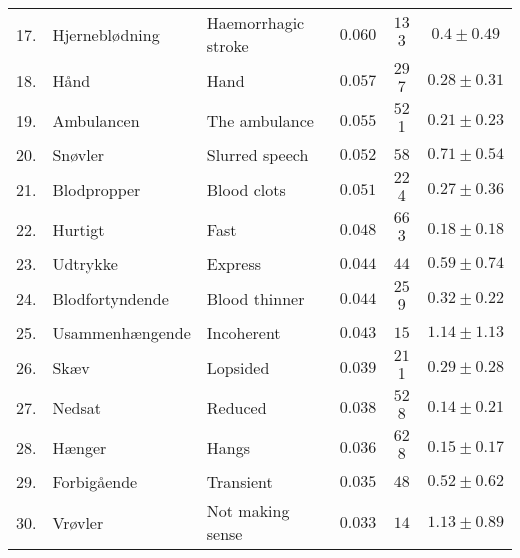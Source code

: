{\begin{table}[h]
{\begin{tabular}{l|llccc}
        17. & Hjerneblødning & Haemorrhagic stroke & $0.060$ & $13$3 & $0.4 \pm 0.49$ \\
        18. & Hånd & Hand & $0.057$ & $29$7 & $0.28 \pm 0.31$ \\
        19. & Ambulancen & The ambulance & $0.055$ & $52$1 & $0.21 \pm 0.23$ \\
        20. & Snøvler & Slurred speech & $0.052$ & $58$ & $0.71 \pm 0.54$ \\
        21. & Blodpropper & Blood clots & $0.051$ & $22$4 & $0.27 \pm 0.36$ \\
        22. & Hurtigt & Fast & $0.048$ & $66$3 & $0.18 \pm 0.18$ \\
        23. & Udtrykke & Express & $0.044$ & $44$ & $0.59 \pm 0.74$ \\
        24. & Blodfortyndende & Blood thinner & $0.044$ & $25$9 & $0.32 \pm 0.22$ \\
        25. & Usammenhængende & Incoherent & $0.043$ & $15$ & $1.14 \pm 1.13$ \\
        26. & Skæv & Lopsided & $0.039$ & $21$1 & $0.29 \pm 0.28$ \\
        27. & Nedsat & Reduced & $0.038$ & $52$8 & $0.14 \pm 0.21$ \\
        28. & Hænger & Hangs & $0.036$ & $62$8 & $0.15 \pm 0.17$ \\
        29. & Forbigående & Transient & $0.035$ & $48$ & $0.52 \pm 0.62$ \\
        30. & Vrøvler & Not making sense & $0.033$ & $14$ & $1.13 \pm 0.89$ \\
        \bottomrule
    \end{tabular}%
    }
\end{table}

}
